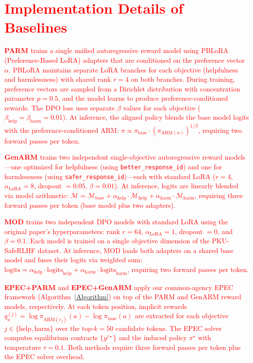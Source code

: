 \documentclass{article}
\begin{document}
\section{\textcolor{red}{Implementation Details of Baselines}}
\label{appendix:implementation}

\textcolor{red}{\textbf{PARM} \citep{lin2025parm} trains a single unified autoregressive reward model using PBLoRA (Preference-Based LoRA) adapters that are conditioned on the preference vector $\alpha$. PBLoRA maintains separate LoRA branches for each objective (helpfulness and harmlessness) with shared rank $r{=}4$ on both branches. During training, preference vectors are sampled from a Dirichlet distribution with concentration parameter $p{=}0.5$, and the model learns to produce preference-conditioned rewards. The DPO loss uses separate $\beta$ values for each objective ($\beta_{\mathrm{help}}{=}\beta_{\mathrm{harm}}{=}0.01$). At inference, the aligned policy blends the base model logits with the preference-conditioned ARM: $\pi \propto \pi_{\mathrm{base}} \cdot (\pi_{\mathrm{ARM}(\alpha)})^{1/\beta}$, requiring two forward passes per token.}

\textcolor{red}{\textbf{GenARM} \citep{xu2024genarm} trains two independent single-objective autoregressive reward models---one optimized for helpfulness (using \texttt{better\_response\_id}) and one for harmlessness (using \texttt{safer\_response\_id})---each with standard LoRA ($r{=}4$, $\alpha_{\mathrm{LoRA}}{=}8$, dropout $= 0.05$, $\beta{=}0.01$). At inference, logits are linearly blended via model arithmetic: $\mathcal{M} = \mathcal{M}_{\mathrm{base}} + \alpha_{\mathrm{help}} \cdot \mathcal{M}_{\mathrm{help}} + \alpha_{\mathrm{harm}} \cdot \mathcal{M}_{\mathrm{harm}}$, requiring three forward passes per token (base model plus two adapters).}

\textcolor{red}{\textbf{MOD} \citep{shi2024decoding} trains two independent DPO models with standard LoRA using the original paper's hyperparameters: rank $r{=}64$, $\alpha_{\mathrm{LoRA}}{=}1$, dropout $= 0$, and $\beta{=}0.1$. Each model is trained on a single objective dimension of the PKU-SafeRLHF dataset. At inference, MOD loads both adapters on a shared base model and fuses their logits via weighted sum: $\mathrm{logits} = \alpha_{\mathrm{help}} \cdot \mathrm{logits}_{\mathrm{help}} + \alpha_{\mathrm{harm}} \cdot \mathrm{logits}_{\mathrm{harm}}$, requiring two forward passes per token.}

\textcolor{red}{\textbf{EPEC+PARM} and \textbf{EPEC+GenARM} apply our common-agency EPEC framework (Algorithm~\ref{Algorithm}) on top of the PARM and GenARM reward models, respectively. At each token position, implicit rewards $q^{(j)}_a = \log \pi_{\mathrm{ARM}(e_j)}(a) - \log \pi_{\mathrm{base}}(a)$ are extracted for each objective $j \in \{\text{help}, \text{harm}\}$ over the top-$k{=}50$ candidate tokens. The EPEC solver computes equilibrium contracts $\{y^{j\star}\}$ and the induced policy $\pi^\star$ with temperature $\tau{=}0.1$. Both methods require three forward passes per token plus the EPEC solver overhead.}
\end{document}
